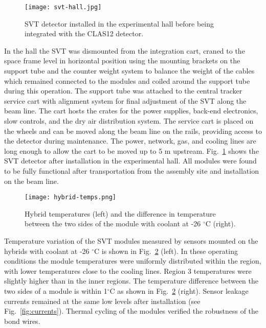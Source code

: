 \begin{figure}[hbt] 
\centering 
\texttt{[image: svt-hall.jpg]}
\caption{SVT detector installed in the experimental hall before being integrated with the CLAS12 detector.}
\label{fig:svt-hall}
\end{figure}

In the hall the SVT was dismounted from the integration cart, craned to the space frame level in horizontal position using the mounting brackets on the support tube and the counter weight system to balance the weight of the cables which remained connected to the modules and coiled around the support tube during this operation. The support tube was attached to the central tracker service cart with alignment system for final adjustment of the SVT along the beam line. The cart hosts the crates for the power supplies, back-end electronics, slow controls, and the dry air distribution system. The service cart is placed on the wheels and can be moved along the beam line on the rails, providing access to the detector during maintenance. The power, network, gas, and cooling lines are long enough to allow the cart to be moved up to 5 m upstream. Fig.~\ref{fig:svt-hall} shows the SVT detector after installation in the experimental hall. All modules were found to be fully functional after transportation from the assembly site and installation on the beam line. 

\begin{figure}[hbt] 
\centering 
\texttt{[image: hybrid-temps.png]}
\caption{Hybrid temperatures (left) and the difference in temperature between the two sides of the module with coolant at -26 $^\circ$C (right).}
\label{fig:hybrid-temps}
\end{figure}

Temperature variation of the SVT modules measured by sensors mounted on the hybrids with coolant at -26 $^\circ$C is shown in Fig.~\ref{fig:hybrid-temps} (left). In these operating conditions the module temperatures were uniformly distributed within the region, with lower temperatures close to the cooling lines. Region 3 temperatures were slightly higher than in the inner regions. The temperature difference between the two sides of a module is within 1$^\circ$C as shown in Fig.~\ref{fig:hybrid-temps} (right). Sensor leakage currents remained at the same low levels after installation (see Fig.~\ref{fig:currents}). Thermal cycling of the modules verified the robustness of the bond wires.

